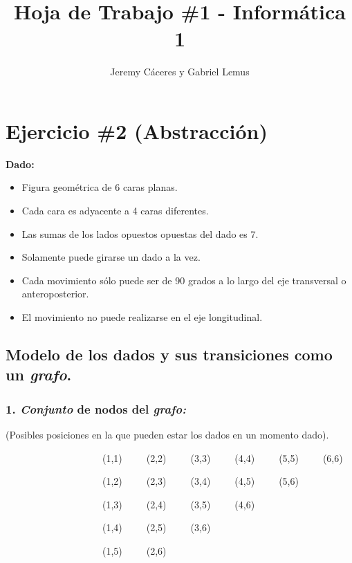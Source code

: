 \documentclass[11pt,letterpaper]{article}
\begin{document}
\title{Hoja de Trabajo \#1 - Informática 1}
\author{Jeremy Cáceres y Gabriel Lemus}
\date{}
\maketitle

\section*{\textbf{Ejercicio \#2 (Abstracción)}}
\textbf{Dado:}

\begin{itemize}
\item Figura geométrica de 6 caras planas.
\item Cada cara es adyacente a 4 caras diferentes.
\item Las sumas de los  lados opuestos opuestas del dado es 7.
\item Solamente puede girarse un dado a la vez.
\item Cada movimiento sólo puede ser de 90 grados a lo largo del eje transversal o anteroposterior.
\item El movimiento no puede realizarse en el eje longitudinal.
\end{itemize}

\subsection*{\textbf{\Large Modelo de los dados y sus transiciones como un \emph{grafo}.}}
\subsubsection*{\textbf{1. \emph{Conjunto} de nodos del \emph{grafo:}}}

(Posibles posiciones en la que pueden estar los dados en un momento dado).
\bigskip

\ \ \ \ \ \ \ \ \ \ \ \ \ \ \ \ \ \ \ \ (1,1)\ \ \ \ \ (2,2)\ \ \ \ \ (3,3)\ \ \ \ \ (4,4)\ \ \ \ \ (5,5)\ \ \ \ \ (6,6)

\ \ \ \ \ \ \ \ \ \ \ \ \ \ \ \ \ \ \ \ (1,2)\ \ \ \ \ (2,3)\ \ \ \ \ (3,4)\ \ \ \ \ (4,5)\ \ \ \ \ (5,6)

\ \ \ \ \ \ \ \ \ \ \ \ \ \ \ \ \ \ \ \ (1,3)\ \ \ \ \ (2,4)\ \ \ \ \ (3,5)\ \ \ \ \ (4,6)

\ \ \ \ \ \ \ \ \ \ \ \ \ \ \ \ \ \ \ \ (1,4)\ \ \ \ \ (2,5)\ \ \ \ \ (3,6)

\ \ \ \ \ \ \ \ \ \ \ \ \ \ \ \ \ \ \ \ (1,5)\ \ \ \ \ (2,6)
\end{document}
